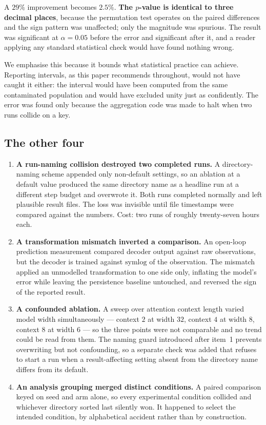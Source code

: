 \documentclass[11pt,onecolumn]{article}
\begin{document}
A $29\%$ improvement becomes $2.5\%$. \textbf{The $p$-value is identical
to three decimal places}, because the permutation test operates on the
paired differences and the sign pattern was unaffected; only the
magnitude was spurious. The result was significant at $\alpha = 0.05$
before the error and significant after it, and a reader applying any
standard statistical check would have found nothing wrong.

We emphasise this because it bounds what statistical practice can
achieve. Reporting intervals, as this paper recommends throughout, would
not have caught it either: the interval would have been computed from
the same contaminated population and would have excluded unity just as
confidently. The error was found only because the aggregation code was
made to halt when two runs collide on a key.

\subsection{The other four}
\begin{enumerate}\itemsep4pt
\item \textbf{A run-naming collision destroyed two completed runs.} A
      directory-naming scheme appended only non-default settings, so an
      ablation at a default value produced the same directory name as a
      headline run at a different step budget and overwrote it. Both
      runs completed normally and left plausible result files. The loss
      was invisible until file timestamps were compared against the
      numbers. Cost: two runs of roughly twenty-seven hours each.
\item \textbf{A transformation mismatch inverted a comparison.} An
      open-loop prediction measurement compared decoder output against
      raw observations, but the decoder is trained against
      $\mathrm{symlog}$ of the observation. The mismatch applied an
      unmodelled transformation to one side only, inflating the model's
      error while leaving the persistence baseline untouched, and
      reversed the sign of the reported result.
\item \textbf{A confounded ablation.} A sweep over attention context
      length varied model width simultaneously --- context $2$ at width
      $32$, context $4$ at width $8$, context $8$ at width $6$ --- so
      the three points were not comparable and no trend could be read
      from them. The naming guard introduced after item~1 prevents
      overwriting but not confounding, so a separate check was added
      that refuses to start a run when a result-affecting setting absent
      from the directory name differs from its default.
\item \textbf{An analysis grouping merged distinct conditions.} A paired
      comparison keyed on seed and arm alone, so every experimental
      condition collided and whichever directory sorted last silently
      won. It happened to select the intended condition, by alphabetical
      accident rather than by construction.
\end{enumerate}
\end{document}
